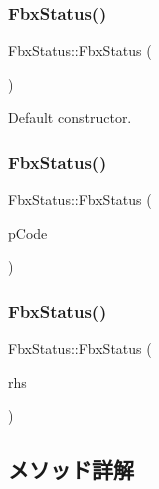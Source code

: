 \subsubsection{\texorpdfstring{Fbx\+Status()}{FbxStatus()}\hspace{0.1cm}{\footnotesize\ttfamily [1/3]}}
{\footnotesize\ttfamily Fbx\+Status\+::\+Fbx\+Status (\begin{DoxyParamCaption}{ }\end{DoxyParamCaption})}



Default constructor. 

\mbox{\label{class_fbx_status_aec4436e434f39c73dd3e4dfb784c14b0}} 
\subsubsection{\texorpdfstring{Fbx\+Status()}{FbxStatus()}\hspace{0.1cm}{\footnotesize\ttfamily [2/3]}}
{\footnotesize\ttfamily Fbx\+Status\+::\+Fbx\+Status (\begin{DoxyParamCaption}\item[{\hyperlink{class_fbx_status_a6a631d5d95b28e31a19aabd5f5809ecc}{E\+Status\+Code}}]{p\+Code }\end{DoxyParamCaption})}

\mbox{\label{class_fbx_status_a6e535b54d854836d79e5a0d4ccac3fd7}} 
\subsubsection{\texorpdfstring{Fbx\+Status()}{FbxStatus()}\hspace{0.1cm}{\footnotesize\ttfamily [3/3]}}
{\footnotesize\ttfamily Fbx\+Status\+::\+Fbx\+Status (\begin{DoxyParamCaption}\item[{const \hyperlink{class_fbx_status}{Fbx\+Status} \&}]{rhs }\end{DoxyParamCaption})}



\subsection{メソッド詳解}
\mbox{\label{class_fbx_status_ae99f70d26d755bb65af9593cf515a4ed}} 

